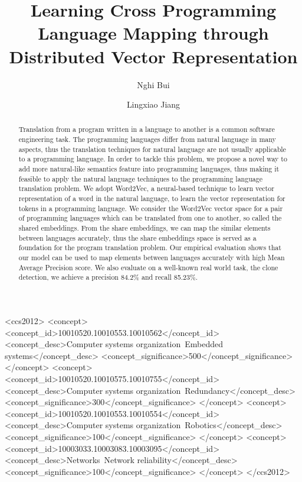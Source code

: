 \documentclass[sigconf]{acmart}
\begin{document}
\title{Learning Cross Programming Language Mapping through Distributed Vector Representation}


\author{Nghi Bui}


\author{Lingxiao Jiang}


\renewcommand{\shortauthors}{Nghi et al.}


\begin{abstract}
Translation from a program written in a language to another is a common software engineering task. The programming languages differ from natural language in many aspects, thus the translation techniques for natural language are not usually applicable to a programming language. In order to tackle this problem, we propose a novel way to add more natural-like semantics feature into programming languages, thus making it feasible to apply the natural language techniques to the programming language translation problem. We adopt Word2Vec, a neural-based technique to learn vector representation of a word in the natural language, to learn the vector representation for tokens in a programming language. We consider the Word2Vec vector space for a pair of programming languages which can be translated from one to another, so called the shared embeddings. From the share embeddings, we can map the similar elements between languages accurately, thus the share embeddings space is served as a foundation for the program translation problem. Our empirical evaluation shows that our model can be used to map elements between languages accurately with high Mean Average Precision score. We also evaluate on a well-known real world task, the clone detection, we achieve a precision 84.2\% and recall 85.23\%.
\end{abstract}

%
%
\begin{CCSXML}
<ccs2012>
 <concept>
  <concept_id>10010520.10010553.10010562</concept_id>
  <concept_desc>Computer systems organization~Embedded systems</concept_desc>
  <concept_significance>500</concept_significance>
 </concept>
 <concept>
  <concept_id>10010520.10010575.10010755</concept_id>
  <concept_desc>Computer systems organization~Redundancy</concept_desc>
  <concept_significance>300</concept_significance>
 </concept>
 <concept>
  <concept_id>10010520.10010553.10010554</concept_id>
  <concept_desc>Computer systems organization~Robotics</concept_desc>
  <concept_significance>100</concept_significance>
 </concept>
 <concept>
  <concept_id>10003033.10003083.10003095</concept_id>
  <concept_desc>Networks~Network reliability</concept_desc>
  <concept_significance>100</concept_significance>
 </concept>
</ccs2012>  
\end{CCSXML}
\end{document}
